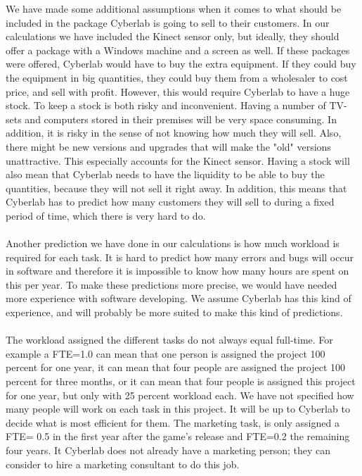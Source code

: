 We have made some additional assumptions when it comes to what should be included in the package Cyberlab is going to sell to their customers. In our calculations we have included the Kinect sensor only, but ideally, they should offer a package with a Windows machine and a screen as well. If these packages were offered, Cyberlab would have to buy the extra equipment. If they could buy the equipment in big quantities, they could buy them from a wholesaler to cost price, and sell with profit. However, this would require Cyberlab to have a huge stock. To keep a stock is both risky and inconvenient. Having a number of TV-sets and computers stored in their premises will be very space consuming. In addition, it is risky in the sense of not knowing how much they will sell. Also, there might be new versions and upgrades that will make the "old" versions unattractive. This especially accounts for the Kinect sensor. Having a stock will also mean that Cyberlab needs to have the liquidity to be able to buy the quantities, because they will not sell it right away. In addition, this means that Cyberlab has to predict how many customers they will sell to during a fixed period of time, which there is very hard to do. \\ \\
Another prediction we have done in our calculations is how much workload is required for each task. It is hard to predict how many errors and bugs will occur in software and therefore it is impossible to know how many hours are spent on this per year. To make these predictions more precise, we would have needed more experience with software developing. We assume Cyberlab has this kind of experience, and will probably be more suited to make this kind of predictions.\\ \\
The workload assigned the different tasks do not always equal full-time. For example a FTE=1.0 can mean that one person is assigned the project 100 percent for one year, it can mean that four people are assigned the project 100 percent for three months, or it can mean that four people is assigned this project for one year, but only with 25 percent workload each. We have not specified how many people will work on each task in this project. It will be up to Cyberlab to decide what is most efficient for them. The marketing task, is only assigned a FTE= 0.5 in the first year after the game’s release and FTE=0.2 the remaining four years. It Cyberlab does not already have a marketing person; they can consider to hire a marketing consultant to do this job. \\ \\
